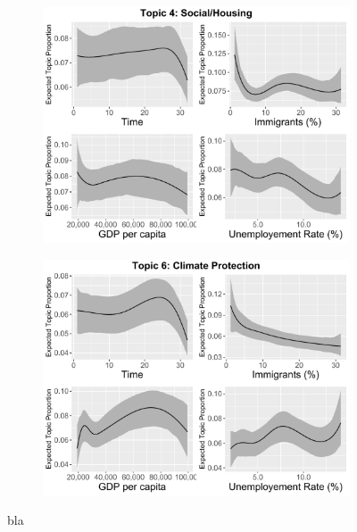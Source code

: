 \begin{figure}[h!]
  \centering
  \begin{subfigure}[b]{0.4\linewidth}
    \includegraphics[width=\linewidth]{../plots/appendix/4_6/beta_t4_cont_ctm.pdf}
  \end{subfigure}
  \begin{subfigure}[b]{0.4\linewidth}
    \includegraphics[width=\linewidth]{../plots/appendix/4_6/beta_t6_cont_ctm.pdf}
  \end{subfigure}
  \caption{bla}
  \label{fig:beta_t46_cont_ctm}
\end{figure}

